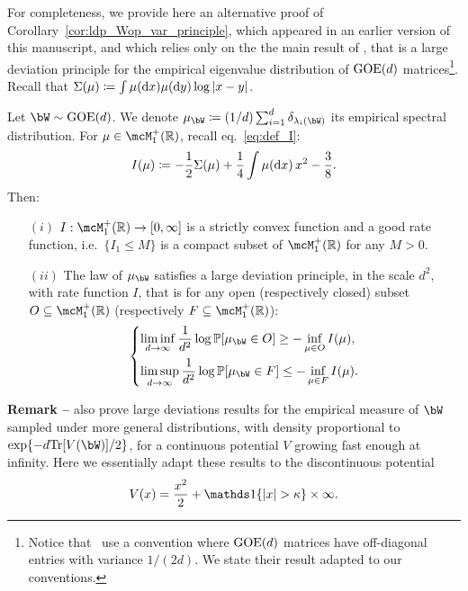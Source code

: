 For completeness, we provide here an alternative proof of Corollary~\ref{cor:ldp_Wop_var_principle}, which appeared in an earlier version of this manuscript,
and which relies only on the 
the main result of \cite{arous1997large}, that is a large deviation principle for the empirical eigenvalue distribution of $\mathrm{GOE}(d)$ matrices\footnote{
    Notice that~\cite{arous1997large} use a convention where $\mathrm{GOE}(d)$ matrices have off-diagonal entries with variance $1/(2d)$. We state their result adapted to our conventions.
}.
Recall that $\Sigma(\mu) \coloneqq \int \mu(\mathrm{d} x) \mu(\mathrm{d} y) \log |x-y|$.
\begin{proposition}\label{prop:ldp_emeasure}
    Let $\bW \sim \GOE(d)$. 
    We denote $\mu_{\bW} \coloneqq (1/d) \sum_{i=1}^d \delta_{\lambda_i(\bW)}$ its empirical spectral distribution. 
    For $\mu \in \mcM_1^+(\bbR)$, recall eq.~\eqref{eq:def_I}:
    \begin{equation}
        I(\mu) \coloneqq -\frac{1}{2} \Sigma(\mu) + \frac{1}{4} \int \mu(\mathrm{d} x) \, x^2 - \frac{3}{8}.
    \end{equation}
    Then: 
    \begin{itemize}
        \item[$(i)$] $I : \mcM_1^+(\bbR) \to [0, \infty]$ is a strictly convex function and a good rate function, i.e.\  
        $\{I_1 \leq M\}$ is a compact subset of $\mcM_1^+(\bbR)$ for any $M > 0$.
        \item[$(ii)$]
        The law of $\mu_\bW$ satisfies a large deviation principle, in the scale $d^2$, with rate function $I$, that is for any 
        open (respectively closed) subset $O \subseteq \mcM_1^+(\bbR)$ (respectively $F \subseteq \mcM_1^+(\bbR)$): 
        \begin{equation*}
            \begin{dcases}
                \liminf_{d\to\infty} \frac{1}{d^2} \log \bbP[\mu_\bW \in O] \geq - \inf_{\mu \in O} I(\mu), \\
                \limsup_{d\to\infty} \frac{1}{d^2} \log \bbP[\mu_\bW \in F] \leq - \inf_{\mu \in F} I(\mu).
            \end{dcases}
        \end{equation*}
    \end{itemize}
\end{proposition}

\myskip
\textbf{Remark --}
\cite{arous1997large} also prove large deviations results for the empirical measure of $\bW$ sampled under more general distributions, with density 
proportional to $\exp\{-d\Tr[V(\bW)]/2\}$, for a continuous potential $V$ growing fast enough at infinity.
Here we essentially adapt these results to the discontinuous potential
\begin{equation*}
    V(x) = \frac{x^2}{2} + \indi\{|x| > \kappa\} \times \infty.
\end{equation*}

